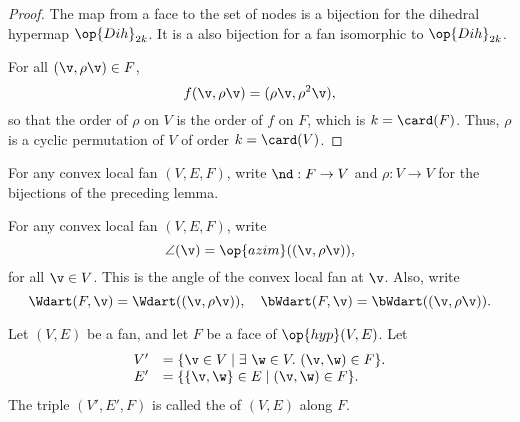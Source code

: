 \begin{proof} The map from a face to the set of nodes is a bijection
  for the dihedral hypermap $\op{Dih}_{2k}$. It is a also bijection
  for a fan isomorphic to $\op{Dih}_{2k}$.

For all $(\v,\rho \v)\in F$,
\begin{displaymath}
f(\v,\rho \v) = (\rho\v,\rho^2\v),
\end{displaymath}
so that the order of $\rho$ on $V$ is the order of $f$ on $F$, which
is $k=\card(F)$.  Thus, $\rho$ is a cyclic permutation of $V$ of order
$k=\card(V)$.
\end{proof}

\begin{definition}[$\rho$,~$\nd$] 
For any convex local fan $(V,E,F)$, write
$\nd:F\to V$ and $\rho:V\to V$ for the bijections of the preceding
lemma.
\end{definition}
%
%

\begin{definition}
For any convex local fan $(V,E,F)$,
write
\begin{displaymath}
\angle(\v) = \op{azim}((\v,\rho\v)),
\end{displaymath}
for all $\v\in V$.  This is the  angle of the convex
local fan at $\v$.  Also, write
\begin{displaymath}
  \Wdart(F,\v) = \Wdart((\v,\rho \v)),\quad 
\bWdart(F,\v) =\bWdart((\v,\rho \v)).
\end{displaymath}
%
%
%
\end{definition}


\begin{definition}[localization]
 Let $(V,E)$ be a fan, and let $F$ be
a face of $\op{hyp}(V,E)$.  Let
\begin{displaymath}
\begin{array}{rll}
V' &= \{\v\in V \mid \exists~\w\in V.~(\v,\w)\in F\}.\\
E' &= \{\{\v,\w\} \in E\mid (\v,\w)\in F\}.
\end{array}
\end{displaymath}
The triple $(V',E',F)$ is called the  of $(V,E)$ along $F$.
\end{definition}
%


